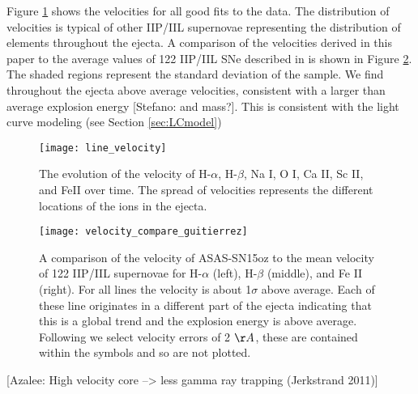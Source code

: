 \documentclass[preprint]{aastex61}
\newcommand{\azaleecomment}[1]{{\color{red} [{#1}]}}
\newcommand{\Azalee}[1]{\azaleecomment{Azalee: #1}}
\newcommand{\stefanocomment}[1]{{\color{cyan} [{#1}]}}
\newcommand{\Stefano}[1]{\stefanocomment{Stefano: #1}}
\begin{document}
Figure \ref{fig:velocity} shows the velocities for all good fits to the data. 
The distribution of velocities is typical of other IIP/IIL supernovae representing the distribution of elements throughout the ejecta. 
A comparison of the velocities derived in this paper to the average values of 122 IIP/IIL SNe described in \citet{2017gutierrez} is shown in Figure \ref{fig:VelocityCompare}. The shaded regions represent the standard deviation of the sample.
We find throughout the ejecta above average velocities, consistent with a larger than average explosion energy \Stefano{and mass?}. 
This is consistent with the light curve modeling (see Section \ref{sec:LCmodel})
\begin{figure}[htbp]
\begin{center}
\texttt{[image: line\_velocity]}
\caption{The evolution of the velocity of H-$\alpha$, H-$\beta$, Na I, O I, Ca II, Sc II, and FeII over time. 
The spread of velocities represents the different locations of the ions in the ejecta.}
\label{fig:velocity}
\end{center}
\end{figure}
\begin{figure}[htbp]
\begin{center}
\texttt{[image: velocity\_compare\_guitierrez]}
\caption{A comparison of the velocity of ASAS-SN15oz to the mean velocity of 122 IIP/IIL supernovae \citep{2017gutierrez} for H-$\alpha$ (left), H-$\beta$ (middle), and Fe II (right).
For all lines the velocity is about 1$\sigma$ above average. 
Each of these line originates in a different part of the ejecta indicating that this is a global trend and the explosion energy is above average. 
Following \citep{2012silverman} we select velocity errors of 2 $\AA$, these are contained within the symbols and so are not plotted.}
\label{fig:VelocityCompare}
\end{center}
\end{figure}
\Azalee{High velocity core --> less gamma ray trapping (Jerkstrand 2011)}
\end{document}
